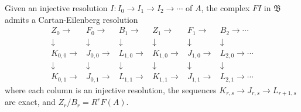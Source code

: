 Given an injective resolution $I : I_0 \to I_1 \to I_2 \to \cdots$ of $A$, the complex $FI$ in $\mathfrak{B}$ admits a Cartan-Eilenberg resolution
\[
\begin{array}{cccccc}
Z_0 \to & F_0 \to & B_1 \to & Z_1 \to & F_1 \to & B_2 \to \cdots \\
\downarrow & \downarrow & \downarrow & \downarrow & \downarrow & \downarrow \\
K_{0,0} \to & J_{0,0} \to & L_{1,0} \to & K_{1,0} \to & J_{1,0} \to & L_{2,0} \to \cdots \\
\downarrow & \downarrow & \downarrow & \downarrow & \downarrow & \downarrow \\
K_{0,1} \to & J_{0,1} \to & L_{1,1} \to & K_{1,1} \to & J_{1,1} \to & L_{2,1} \to \cdots
\end{array}
\]
where each column is an injective resolution, the sequences $K_{r,s} \to J_{r,s} \to L_{r+1,s}$ are exact, and $Z_r/B_r = R^r F(A)$.